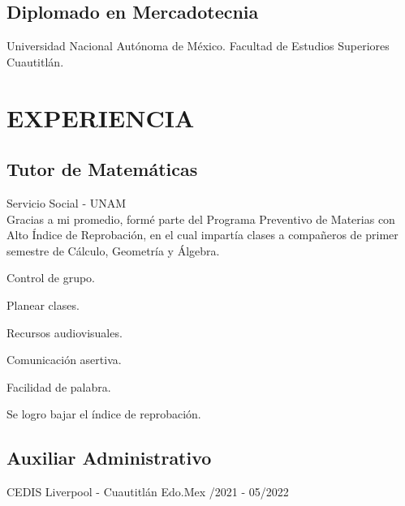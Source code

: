 \documentclass[10pt,letterpaper]{article}
\begin{document}
\subsection*{Diplomado en Mercadotecnia}
Universidad Nacional Autónoma de México. Facultad de Estudios Superiores Cuautitlán.

\vspace{4mm}

\section*{EXPERIENCIA}
\vspace{2mm}
\subsection*{Tutor de Matemáticas}
{\small Servicio Social - UNAM }\\

Gracias a mi promedio, formé parte del Programa Preventivo de Materias con Alto Índice de Reprobación, en el cual impartía clases a compañeros de primer semestre de Cálculo, Geometría y Álgebra.


\begin{itemize}
\setlength{\itemsep}{-0.8mm}
\setlength{\labelwidth}{-0.3cm}

\begin{multicols}{2}
\item Control de grupo.
\item Planear clases.
\item Recursos audiovisuales.

\columnbreak

\item Comunicación asertiva.
\item Facilidad de palabra.
\item Se logro bajar el índice de reprobación.

\end{multicols}
\end{itemize}
      
  


\subsection*{Auxiliar Administrativo}
{\small CEDIS Liverpool - Cuautitlán Edo.Mex /2021 - 05/2022}
\end{document}
